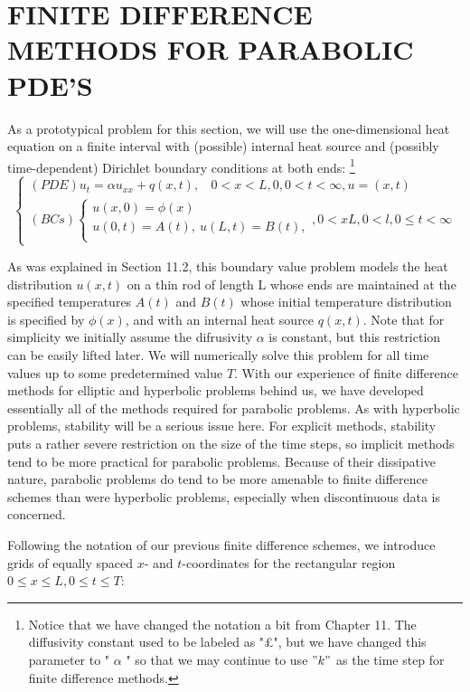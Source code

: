 \documentclass[../main.tex]{subfiles}
\begin{document}
\section{FINITE DIFFERENCE METHODS FOR PARABOLIC PDE'S}

As a prototypical problem for this section, we will use the one-dimensional heat equation on a finite interval with (possible) internal heat source and (possibly time-dependent) Dirichlet boundary conditions at both ends:
\footnote{Notice that we have changed the notation a bit from Chapter 11. The diffusivity constant used to be labeled as "£", but we have changed this parameter to " $\alpha$ " so that we may continue to use $"k"$ as the time step for finite difference methods. }
\begin{equation}\label{eqa42}
\begin{cases} 
	(PDE) u_t=\alpha u_{xx}+q(x,t),~~~~0<x<L,0, 0<t<\infty,u=(x,t)\\
(BCs)
		\begin{cases}
		 u(x,0)=\phi(x)\\
		 u(0,t)=A(t),~u(L,t)=B(t),\\
		\end{cases} 
		, 0< x L, 0 < l, 0\leqslant t < \infty
	\end{cases}
\end{equation}

As was explained in Section 11.2, this boundary value problem models the heat distribution $u(x,t)$ on a thin rod of length L whose ends are maintained at the specified temperatures $A(t)$ and $B(t)$ whose initial temperature distribution is specified by $\phi(x)$, and with an internal heat source $q(x,t)$. Note that for simplicity we initially assume the difrusivity $\alpha$ is constant, but this restriction can be easily lifted later. We will numerically solve this problem for all time values up to some predetermined value $T$. With our experience of finite difference methods for elliptic and hyperbolic problems behind us, we have developed essentially all of the methods required for parabolic problems. As with hyperbolic problems, stability will be a serious issue here. For explicit methods, stability puts a rather severe restriction on the size of the time steps, so implicit methods tend to be more practical for parabolic problems. Because of their dissipative nature, parabolic problems do tend to be more amenable to finite difference schemes than were hyperbolic problems, especially when discontinuous data is concerned. 


Following the notation of our previous finite difference schemes, we introduce grids of equally spaced $x$- and $t$-coordinates for the rectangular region $0 \leqslant x \leqslant L, 0\leqslant t \leqslant T$:
\end{document}
